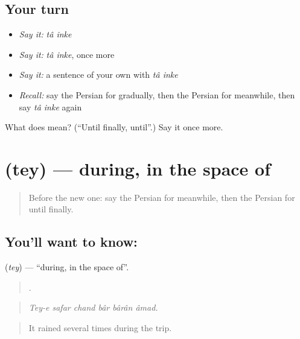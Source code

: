 \subsection*{Your turn}
\begin{itemize}
\raggedright
  \item \emph{Say it:} \emph{tâ inke}
  \item \emph{Say it:} \emph{tâ inke}, once more
  \item \emph{Say it:} a sentence of your own with \emph{tâ inke}
  \item \emph{Recall:} say the Persian for gradually, then the Persian for meanwhile, then say \emph{tâ inke} again
\end{itemize}

\begin{tcolorbox}[breakable,colback=teal!4,colframe=teal!35!black,title={Before you move on}]
What does   mean? (\textquotedblleft{}Until finally, until\textquotedblright{}.) Say it once more.
\end{tcolorbox}
\section[\texorpdfstring{\fa{طی} (tey)}{طی (tey)}]{ (tey) — during, in the space of}

\label{lesson:FA-C306-tey}



\begin{quote}
Before the new one: say the Persian for meanwhile, then the Persian for until finally.
\end{quote}

\subsection*{You'll want to know: }
\textbf{} (\emph{tey}) — \textquotedblleft{}during, in the space of\textquotedblright{}.

\begin{quote}
     .
\end{quote}

\begin{quote}
\emph{Tey-e safar chand bâr bârân âmad.}
\end{quote}

\begin{quote}
It rained several times during the trip.
\end{quote}

